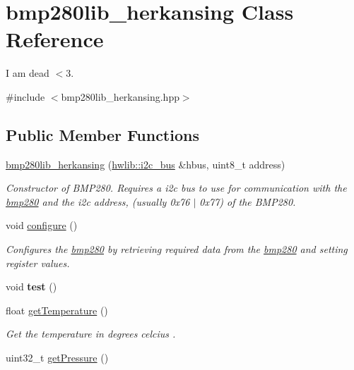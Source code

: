 \hypertarget{classbmp280lib__herkansing}{}\section{bmp280lib\+\_\+herkansing Class Reference}
\label{classbmp280lib__herkansing}


I am dead $<$3.  




{\ttfamily \#include $<$bmp280lib\+\_\+herkansing.\+hpp$>$}

\subsection*{Public Member Functions}
\begin{DoxyCompactItemize}
\item 
\mbox{\hyperlink{classbmp280lib__herkansing_a3cc4f7a6f0d825cfc58cd88fc9db173b}{bmp280lib\+\_\+herkansing}} (\mbox{\hyperlink{classhwlib_1_1i2c__bus}{hwlib\+::i2c\+\_\+bus}} \&hbus, uint8\+\_\+t address)
\begin{DoxyCompactList}\small\item\em Constructor of B\+M\+P280. Requires a i2c bus to use for communication with the \mbox{\hyperlink{classbmp280}{bmp280}} and the i2c address, (usually 0x76 $\vert$ 0x77) of the B\+M\+P280. \end{DoxyCompactList}\item 
void \mbox{\hyperlink{classbmp280lib__herkansing_aca822c7f1ef89422a995adaceadee032}{configure}} ()
\begin{DoxyCompactList}\small\item\em Configures the \mbox{\hyperlink{classbmp280}{bmp280}} by retrieving required data from the \mbox{\hyperlink{classbmp280}{bmp280}} and setting register values. \end{DoxyCompactList}\item 
\mbox{\label{classbmp280lib__herkansing_a4b49dc7303ea9f0e9aab8cf287eac352}} 
void {\bfseries test} ()
\item 
float \mbox{\hyperlink{classbmp280lib__herkansing_aa92e440eb6fe9ca0e0622bbcc244478c}{get\+Temperature}} ()
\begin{DoxyCompactList}\small\item\em Get the temperature in degrees celcius . \end{DoxyCompactList}\item 
uint32\+\_\+t \mbox{\hyperlink{classbmp280lib__herkansing_a89c716a3a52660f3d54f13dca2436211}{get\+Pressure}} ()

\end{DoxyCompactItemize}
